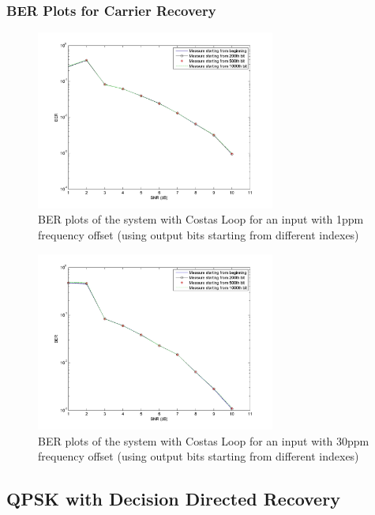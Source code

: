 \documentclass[]{article}
\begin{document}
\subsubsection{BER Plots for Carrier Recovery}
\begin{figure}[H]
\centering
\hspace*{-2cm}\includegraphics[width=0.7\textwidth]{qpBERfo_costas1.jpg}
\caption{BER plots of the system with Costas Loop for an input with 1ppm frequency offset (using output bits starting from different indexes) \label{fig:costasBERFreq1}}
\end{figure}

\begin{figure}[H]
\centering
\hspace*{-2cm}\includegraphics[width=0.7\textwidth]{qpBERfo_costas2.jpg}
\caption{BER plots of the system with Costas Loop for an input with 30ppm frequency offset (using output bits starting from different indexes) \label{fig:costasBERFreq2}}
\end{figure}

\subsection{QPSK with Decision Directed Recovery}
\end{document}
